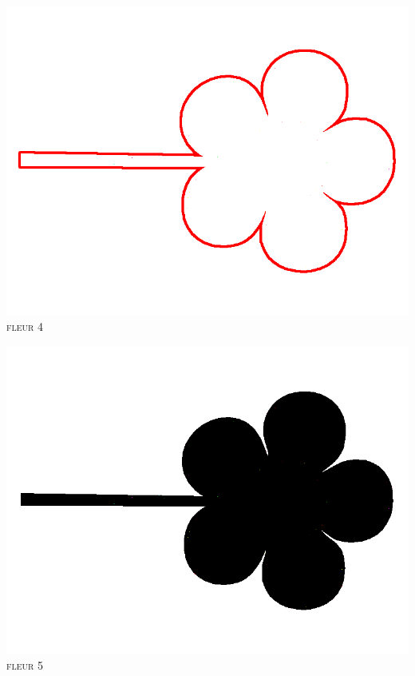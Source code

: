 \documentclass[french]{article}
\begin{document}
  \begin{center}
    \begin{minipage}{.45\textwidth}
      \begin{center}
	\includegraphics[scale=0.19]{./pictures/flower5.png}\\
	\textsc{fleur 4}
      \end{center}
    \end{minipage}
    \begin{minipage}{.45\textwidth}
      \begin{center}
	\includegraphics[scale=0.19]{./pictures/flower6.png}\\
	\textsc{fleur 5}
      \end{center}
    \end{minipage}
  \end{center}
\end{document}
